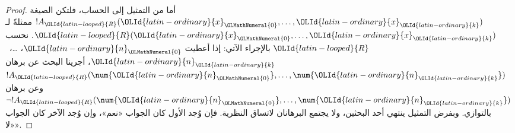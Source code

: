 \documentclass[../../../include/open-logic-section]{subfiles}
\begin{document}
\begin{proof}
أما من التمثيل إلى الحساب، فلتكن الصيغة $!A_{\OLId{latin-looped}{R}}({\OLId{latin-ordinary}{x}}_{\OLMathNumeral{0}},\dots,{\OLId{latin-ordinary}{x}}_{\OLId{latin-ordinary}{k}})$ ممثلةً
لـ${\OLId{latin-looped}{R}}({\OLId{latin-ordinary}{x}}_{\OLMathNumeral{0}},\dots,{\OLId{latin-ordinary}{x}}_{\OLId{latin-ordinary}{k}})$. نحسب ${\OLId{latin-looped}{R}}$ بالإجراء الآتي:
إذا أعطيت ${\OLId{latin-ordinary}{n}}_{\OLMathNumeral{0}}$، \dots،~${\OLId{latin-ordinary}{n}}_{\OLId{latin-ordinary}{k}}$، أجرينا البحث عن برهان
$!A_{\OLId{latin-looped}{R}}(\num{{\OLId{latin-ordinary}{n}}_{\OLMathNumeral{0}}},\dots,\num{{\OLId{latin-ordinary}{n}}_{\OLId{latin-ordinary}{k}}})$ وعن برهان
$\lnot !A_{\OLId{latin-looped}{R}}(\num{{\OLId{latin-ordinary}{n}}_{\OLMathNumeral{0}}},\dots,\num{{\OLId{latin-ordinary}{n}}_{\OLId{latin-ordinary}{k}}})$ بالتوازي.
وبفرض التمثيل ينتهي أحد البحثين، ولا يجتمع البرهانان لاتساق النظرية.
فإن وُجد الأول كان الجواب «نعم»، وإن وُجد الآخر كان الجواب «لا».


\end{proof}
\end{document}
